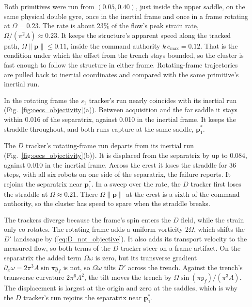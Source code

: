 \documentclass[lettersize,journal]{IEEEtran}
\begin{document}
Both primitives were run from $(0.05, 0.40)$, just inside the upper saddle,
on the same physical double gyre, once in the inertial frame and once in a
frame rotating at $\Omega = 0.23$. The rate is about 23\% of the flow's
peak strain rate, $\Omega/(\pi^2 A) \approx 0.23$. It keeps the structure's
apparent speed along the tracked path, $\Omega\lVert\mathbf{p}\rVert \leq
0.11$, inside the command authority $k\,c_{\max} = 0.12$. That is the
condition under which the offset from the trench stays bounded, so the cluster is fast enough to follow the structure in either
frame. Rotating-frame trajectories are pulled back to inertial coordinates
and compared with the same primitive's inertial run.

In the rotating frame the $s_1$ tracker's run nearly coincides with its
inertial run (Fig.~\ref{fig:oecs_objectivity}(a)). Between acquisition and
the far saddle it stays within 0.016 of the separatrix, against 0.010 in
the inertial frame. It keeps the straddle throughout, and both runs capture
at the same saddle, $\mathbf{p}_1^*$.

The $D$ tracker's rotating-frame run departs from its inertial run
(Fig.~\ref{fig:oecs_objectivity}(b)). It is displaced from the separatrix
by up to 0.084, against 0.010 in the inertial frame. Across the crest it
loses the straddle for 36 steps, with all six robots on one side of the
separatrix, the failure \cite{26} reports. It rejoins the separatrix near
$\mathbf{p}_1^*$. In a sweep over the rate, the $D$ tracker first loses the
straddle at $\Omega \approx 0.21$. There $\Omega\lVert\mathbf{p}\rVert$ at
the crest is a sixth of the command authority, so the cluster has speed to
spare when the straddle breaks.

The trackers diverge because the frame's spin enters the $D$ field, while
the strain only co-rotates. The rotating frame adds a uniform vorticity $2\Omega$, which
shifts the $D'$ landscape by (\ref{eq:D_not_objective}). It also adds its
transport velocity to the measured flow, so both terms of the $D$ tracker
steer on a frame artifact. On the separatrix the added term
$\Omega\omega$ is zero, but its transverse gradient
$\partial_x\omega = 2\pi^3 A\sin\pi y_f$ is not, so $\Omega\omega$ tilts
$D'$ across the trench. Against the trench's transverse curvature
$2\pi^6 A^2$, the tilt moves the trench by
$\Omega\sin(\pi y_f)/(\pi^3 A)$. The displacement is largest at the origin
and zero at the saddles, which is why the $D$ tracker's run rejoins the
separatrix near $\mathbf{p}_1^*$.
\end{document}
